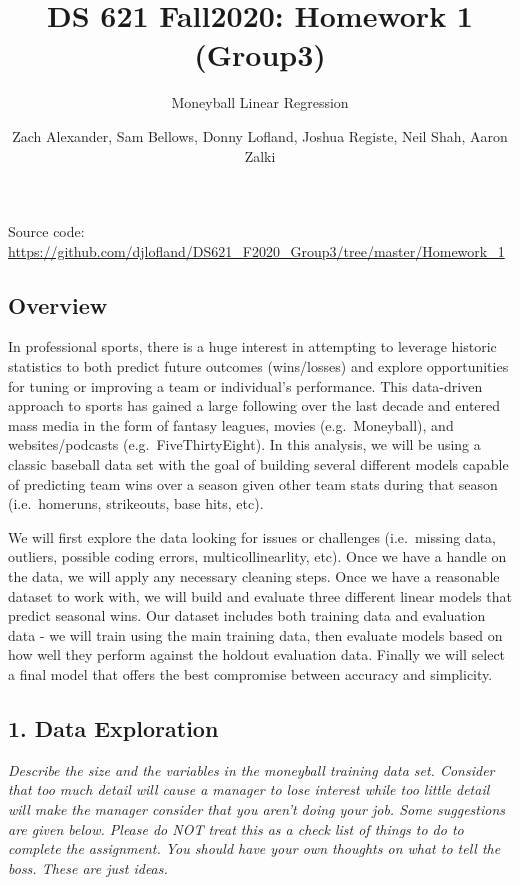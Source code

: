 \documentclass[
]{article}
\title{DS 621 Fall2020: Homework 1 (Group3)}
\subtitle{Moneyball Linear Regression}
\author{Zach Alexander, Sam Bellows, Donny Lofland, Joshua Registe, Neil Shah,
Aaron Zalki}
\date{}
\begin{document}
\maketitle

Source code:
\url{https://github.com/djlofland/DS621_F2020_Group3/tree/master/Homework_1}

\hypertarget{overview}{%
\subsection{Overview}\label{overview}}

In professional sports, there is a huge interest in attempting to
leverage historic statistics to both predict future outcomes
(wins/losses) and explore opportunities for tuning or improving a team
or individual's performance. This data-driven approach to sports has
gained a large following over the last decade and entered mass media in
the form of fantasy leagues, movies (e.g.~Moneyball), and
websites/podcasts (e.g.~FiveThirtyEight). In this analysis, we will be
using a classic baseball data set with the goal of building several
different models capable of predicting team wins over a season given
other team stats during that season (i.e.~homeruns, strikeouts, base
hits, etc).

We will first explore the data looking for issues or challenges
(i.e.~missing data, outliers, possible coding errors,
multicollinearlity, etc). Once we have a handle on the data, we will
apply any necessary cleaning steps. Once we have a reasonable dataset to
work with, we will build and evaluate three different linear models that
predict seasonal wins. Our dataset includes both training data and
evaluation data - we will train using the main training data, then
evaluate models based on how well they perform against the holdout
evaluation data. Finally we will select a final model that offers the
best compromise between accuracy and simplicity.

\hypertarget{data-exploration}{%
\subsection{1. Data Exploration}\label{data-exploration}}

\emph{Describe the size and the variables in the moneyball training data
set. Consider that too much detail will cause a manager to lose interest
while too little detail will make the manager consider that you aren't
doing your job. Some suggestions are given below. Please do NOT treat
this as a check list of things to do to complete the assignment. You
should have your own thoughts on what to tell the boss. These are just
ideas.}
\end{document}
